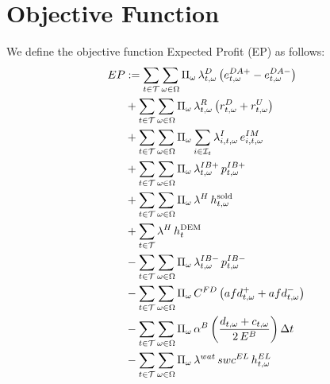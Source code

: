 \documentclass{article}
\begin{document}
\section{Objective Function}
\label{SEC:ObjectiveFunction}
We define the objective function Expected Profit (EP) as follows:
\begin{subequations}
\begin{align}
    EP & := \sum_{t \in \mathcal{T}} \sum_{\omega \in \Omega}
            \Pi_{\omega}\, \lambda^D_{t,\omega}
            \left(e^{DA+}_{t,\omega} - e^{DA-}_{t,\omega}\right)
            \label{EQ:DAincome} \\
       & + \sum_{t \in \mathcal{T}} \sum_{\omega \in \Omega}
            \Pi_{\omega}\, \lambda^R_{t,\omega}
            \left(r^{D}_{t,\omega} + r^{U}_{t,\omega}\right)
            \label{EQ:RESincome} \\
       & + \sum_{t \in \mathcal{T}} \sum_{\omega \in \Omega}
            \Pi_{\omega} \sum_{i \in \mathcal{I}_t}
            \lambda^{I}_{i,t,\omega}\, e^{IM}_{i,t,\omega}
            \label{EQ:IMincome} \\
       & + \sum_{t \in \mathcal{T}} \sum_{\omega \in \Omega}
            \Pi_{\omega}\, \lambda^{IB+}_{t,\omega}\, p^{IB+}_{t,\omega}
            \label{EQ:PosIBcollectRights} \\
       & + \sum_{t \in \mathcal{T}} \sum_{\omega \in \Omega}
            \Pi_{\omega}\, \lambda^{H}\, h^{\rm sold}_{t,\omega}
            \label{EQ:HydrogenRevenue} \\
       & + \sum_{t \in \mathcal{T}}
            \lambda^{H}\, h^{\rm DEM}_{t}
            \label{EQ:InternalH2DemandRevenue} \\
       & - \sum_{t \in \mathcal{T}} \sum_{\omega \in \Omega}
            \Pi_{\omega}\, \lambda^{IB-}_{t,\omega}\, p^{IB-}_{t,\omega}
            \label{EQ:NegIBPayObligations} \\
       & - \sum_{t \in \mathcal{T}} \sum_{\omega \in \Omega}
            \Pi_{\omega}\, C^{FD}
            \left(afd^+_{t,\omega} + afd^-_{t,\omega}\right)
            \label{EQ:FlexDemCost} \\
       & - \sum_{t \in \mathcal{T}} \sum_{\omega \in \Omega}
            \Pi_{\omega}\, \alpha^{B}
            \left(\frac{d_{t,\omega} + c_{t,\omega}}{2\, E^{B}}\right) \Delta t
            \label{EQ:BatteryAgeing} \\
       & - \sum_{t \in \mathcal{T}} \sum_{\omega \in \Omega}
            \Pi_{\omega}\, \lambda^{wat}\, swc^{EL}\, h^{EL}_{t,\omega}
            \label{EQ:WaterCost} \\

\end{align}
\end{subequations}
\end{document}
